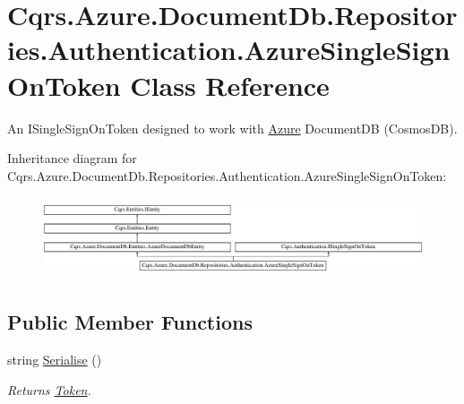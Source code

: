 \hypertarget{classCqrs_1_1Azure_1_1DocumentDb_1_1Repositories_1_1Authentication_1_1AzureSingleSignOnToken}{}\section{Cqrs.\+Azure.\+Document\+Db.\+Repositories.\+Authentication.\+Azure\+Single\+Sign\+On\+Token Class Reference}
\label{classCqrs_1_1Azure_1_1DocumentDb_1_1Repositories_1_1Authentication_1_1AzureSingleSignOnToken}


An I\+Single\+Sign\+On\+Token designed to work with \hyperlink{namespaceCqrs_1_1Azure}{Azure} Document\+DB (Cosmos\+DB).  


Inheritance diagram for Cqrs.\+Azure.\+Document\+Db.\+Repositories.\+Authentication.\+Azure\+Single\+Sign\+On\+Token\+:\begin{figure}[H]
\begin{center}
\leavevmode
\includegraphics[height=2.403434cm]{classCqrs_1_1Azure_1_1DocumentDb_1_1Repositories_1_1Authentication_1_1AzureSingleSignOnToken}
\end{center}
\end{figure}
\subsection*{Public Member Functions}
\begin{DoxyCompactItemize}
\item 
string \hyperlink{classCqrs_1_1Azure_1_1DocumentDb_1_1Repositories_1_1Authentication_1_1AzureSingleSignOnToken_a55c07b93600e6863985b50d4df346af0_a55c07b93600e6863985b50d4df346af0}{Serialise} ()
\begin{DoxyCompactList}\small\item\em Returns \hyperlink{classCqrs_1_1Azure_1_1DocumentDb_1_1Repositories_1_1Authentication_1_1AzureSingleSignOnToken_ad8db4fad59b85056e4e37c9e29226425_ad8db4fad59b85056e4e37c9e29226425}{Token}. \end{DoxyCompactList}\end{DoxyCompactItemize}
